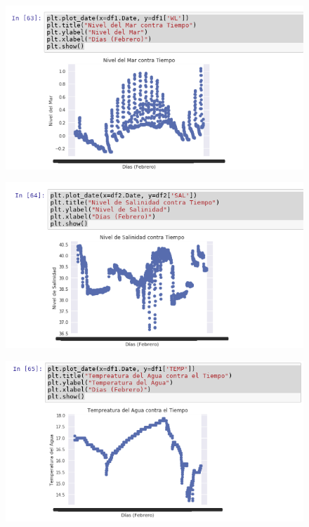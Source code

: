 \documentclass{article}
\begin{document}
\begin{figure}[H]
	\centering
    \includegraphics[width=\linewidth]{t1.png}\\
\end{figure}
\begin{figure}[H]
	\centering
    \includegraphics[width=\linewidth]{t2.png}\\
\end{figure}
\begin{figure}[H]
	\centering
    \includegraphics[width=\linewidth]{t3.png}\\
\end{figure}
\end{document}
